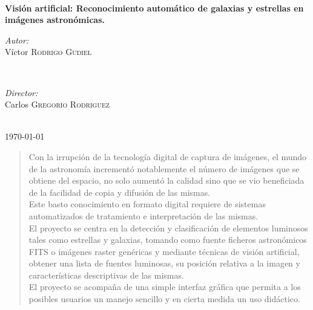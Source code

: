 \begin{titlepage}
		\HRule \\[0.2cm]
		{ \huge \bfseries Visión artificial: Reconocimiento automático de galaxias y estrellas en imágenes astronómicas.} %
		\HRule \\[0.4cm]
		
		
		\begin{minipage}{0.4\textwidth}
			\begin{flushleft} \large
				\emph{Autor:}\\
				Víctor \textsc{Rodrigo Gudiel} %
			\end{flushleft}
		\end{minipage}
		~
		\begin{minipage}{0.4\textwidth}
			\begin{flushright} \large
				\emph{Director:} \\
				Carlos  \textsc{Gregorio Rodriguez} %
			\end{flushright}
		\end{minipage}\\[0.4cm] 
		

		
			
			{\large \today}\\[2cm] %
		\vfill %
		
	\end{titlepage}

	\begin{abstract}
		Con la irrupción de la tecnología digital de captura de imágenes, el mundo de la astronomía incrementó notablemente el número de imágenes que se obtiene del espacio, no solo aumentó la calidad sino que se vio beneficiada de la facilidad de copia y difusión de las mismas.\\
		Este basto conocimiento en formato digital requiere de sistemas automatizados de tratamiento e interpretación de las mismas.\\
		El proyecto se centra en la detección y clasificación de elementos luminosos tales como estrellas y galaxias, tomando como fuente ficheros astronómicos FITS o imágenes raster genéricas y mediante técnicas de visión artificial, obtener una lista de fuentes luminosas, su posición relativa a la imagen y características descriptivas de las mismas.\\
		El proyecto se acompaña de una simple interfaz gráfica que permita a los posibles usuarios un manejo sencillo y en cierta medida un uso didáctico.\\
	\end{abstract}
	

